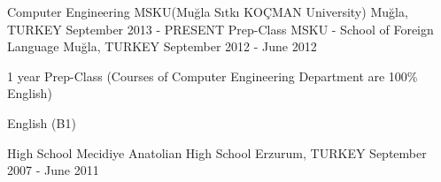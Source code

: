 \begin{cventries}
    \cventry
        {Computer Engineering}
        {MSKU(Muğla Sıtkı KOÇMAN University)}
        {Muğla, TURKEY}
        {September 2013 - PRESENT}
        {}
    \cventry
        {Prep-Class}
        {MSKU - School of Foreign Language }
        {Muğla, TURKEY}
        {September 2012 - June 2012}
        {
            \begin {cvitems}
                \item {1 year Prep-Class (Courses of Computer Engineering Department are 100\% English)}
                \item {English (B1)}
            \end {cvitems}
        }
    \cventry
        {High School}
        {Mecidiye Anatolian High School}
        {Erzurum, TURKEY}
        {September 2007 - June 2011}
        {}

\end{cventries}
